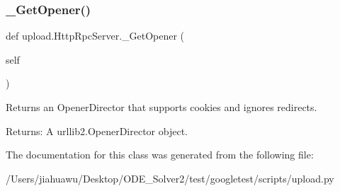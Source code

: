 \subsubsection{\texorpdfstring{\+\_\+\+Get\+Opener()}{\_GetOpener()}}
{\footnotesize\ttfamily def upload.\+Http\+Rpc\+Server.\+\_\+\+Get\+Opener (\begin{DoxyParamCaption}\item[{}]{self }\end{DoxyParamCaption})\hspace{0.3cm}{\ttfamily [private]}}

\begin{DoxyVerb}Returns an OpenerDirector that supports cookies and ignores redirects.

Returns:
  A urllib2.OpenerDirector object.
\end{DoxyVerb}
 

The documentation for this class was generated from the following file\+:\begin{DoxyCompactItemize}
\item 
/\+Users/jiahuawu/\+Desktop/\+O\+D\+E\+\_\+\+Solver2/test/googletest/scripts/upload.\+py\end{DoxyCompactItemize}
